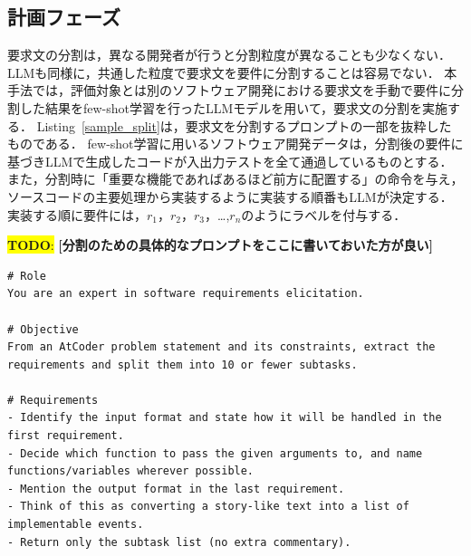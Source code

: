 \documentclass[submit,techrep,noauthor]{ipsj}
\newcommand{\todo}[1]{\colorbox{yellow}{{\bf TODO}:}{\color{red} {\textbf{[#1]}}}}
\begin{document}
\subsection{計画フェーズ}
要求文の分割は，異なる開発者が行うと分割粒度が異なることも少なくない\cite{split_size}．LLMも同様に，共通した粒度で要求文を要件に分割することは容易でない．
本手法では，評価対象とは別のソフトウェア開発における要求文を手動で要件に分割した結果をfew-shot学習を行ったLLMモデルを用いて，要求文の分割を実施する．
Listing~\ref{sample_split}は，要求文を分割するプロンプトの一部を抜粋したものである．
few-shot学習に用いるソフトウェア開発データは，分割後の要件に基づきLLMで生成したコードが入出力テストを全て通過しているものとする．
また，分割時に「重要な機能であればあるほど前方に配置する」の命令を与え，ソースコードの主要処理から実装するように実装する順番もLLMが決定する．
実装する順に要件には，$r_1$，$r_2$，$r_3$，\dots,$r_n$のようにラベルを付与する．

\todo{分割のための具体的なプロンプトをここに書いておいた方が良い}
\begin{lstlisting}[caption=要求分割のためのプロンプト（一部抜粋）, label=sample_split, captionpos=t, columns=fullflexible, breaklines=true]
# Role
You are an expert in software requirements elicitation.

# Objective
From an AtCoder problem statement and its constraints, extract the requirements and split them into 10 or fewer subtasks.

# Requirements
- Identify the input format and state how it will be handled in the first requirement.
- Decide which function to pass the given arguments to, and name functions/variables wherever possible.
- Mention the output format in the last requirement.
- Think of this as converting a story-like text into a list of implementable events.
- Return only the subtask list (no extra commentary).
\end{lstlisting}

\end{document}
